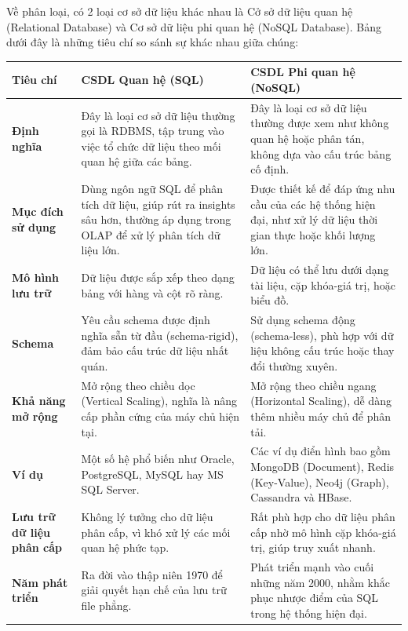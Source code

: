 Về phân loại, có 2 loại cơ sở dữ liệu khác nhau là Cở sở dữ liệu quan hệ (Relational Database) và Cơ sở dữ liệu phi quan hệ (NoSQL Database). Bảng dưới đây là những tiêu chí so sánh sự khác nhau giữa chúng:
\begin{table}[H]
\centering
\renewcommand{\arraystretch}{1.3} %
\setlength{\tabcolsep}{6pt}
\begin{tabularx}{\textwidth}{|l|X|X|}
\hline
\textbf{Tiêu chí} & \textbf{CSDL Quan hệ (SQL)} & \textbf{CSDL Phi quan hệ (NoSQL)} \\ \hline
\textbf{Định nghĩa} & Đây là loại cơ sở dữ liệu thường gọi là RDBMS, tập trung vào việc tổ chức dữ liệu theo mối quan hệ giữa các bảng. & Đây là loại cơ sở dữ liệu thường được xem như không quan hệ hoặc phân tán, không dựa vào cấu trúc bảng cố định. \\ \hline
\textbf{Mục đích sử dụng} & Dùng ngôn ngữ SQL để phân tích dữ liệu, giúp rút ra insights sâu hơn, thường áp dụng trong OLAP để xử lý phân tích dữ liệu lớn. & Được thiết kế để đáp ứng nhu cầu của các hệ thống hiện đại, như xử lý dữ liệu thời gian thực hoặc khối lượng lớn. \\ \hline
\textbf{Mô hình lưu trữ} & Dữ liệu được sắp xếp theo dạng bảng với hàng và cột rõ ràng. & Dữ liệu có thể lưu dưới dạng tài liệu, cặp khóa-giá trị, hoặc biểu đồ. \\ \hline
\textbf{Schema} & Yêu cầu schema được định nghĩa sẵn từ đầu (schema-rigid), đảm bảo cấu trúc dữ liệu nhất quán. & Sử dụng schema động (schema-less), phù hợp với dữ liệu không cấu trúc hoặc thay đổi thường xuyên. \\ \hline
\textbf{Khả năng mở rộng} & Mở rộng theo chiều dọc (Vertical Scaling), nghĩa là nâng cấp phần cứng của máy chủ hiện tại. & Mở rộng theo chiều ngang (Horizontal Scaling), dễ dàng thêm nhiều máy chủ để phân tải. \\ \hline
\textbf{Ví dụ} & Một số hệ phổ biến như Oracle, PostgreSQL, MySQL hay MS SQL Server. & Các ví dụ điển hình bao gồm MongoDB (Document), Redis (Key-Value), Neo4j (Graph), Cassandra và HBase. \\ \hline
\textbf{Lưu trữ dữ liệu phân cấp} & Không lý tưởng cho dữ liệu phân cấp, vì khó xử lý các mối quan hệ phức tạp. & Rất phù hợp cho dữ liệu phân cấp nhờ mô hình cặp khóa-giá trị, giúp truy xuất nhanh. \\ \hline
\textbf{Năm phát triển} & Ra đời vào thập niên 1970 để giải quyết hạn chế của lưu trữ file phẳng. & Phát triển mạnh vào cuối những năm 2000, nhằm khắc phục nhược điểm của SQL trong hệ thống hiện đại. \\ \hline

\end{tabularx}
\end{table}
